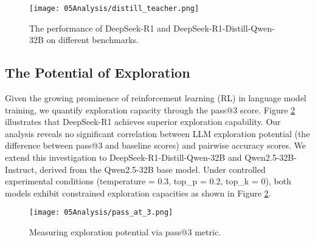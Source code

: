 \begin{figure}
    \centering
\texttt{[image: 05Analysis/distill\_teacher.png]}
    \caption{The performance of DeepSeek-R1 and DeepSeek-R1-Distill-Qwen-32B on different benchmarks.}
    \label{fig:distill-teacher}
\end{figure}

\subsection{The Potential of Exploration}
Given the growing prominence of reinforcement learning (RL) in language model training, we quantify exploration capacity through the pass@3 score.
Figure \ref{fig:pass_at_3} illustrates that DeepSeek-R1 achieves superior exploration capability.
Our analysis reveals no significant correlation between LLM exploration potential (the difference between pass@3 and baseline scores) and pairwise accuracy scores.
We extend this investigation to DeepSeek-R1-Distill-Qwen-32B and Qwen2.5-32B-Instruct, derived from the Qwen2.5-32B base model.
Under controlled experimental conditions (temperature = 0.3, top\_p = 0.2, top\_k = 0), both models exhibit constrained exploration capacities as shown in Figure \ref{fig:pass_at_3}.


\begin{figure}
    \centering
    \texttt{[image: 05Analysis/pass\_at\_3.png]}
    \caption{Measuring exploration potential via pass@3 metric.}
    \label{fig:pass_at_3}
\end{figure}

